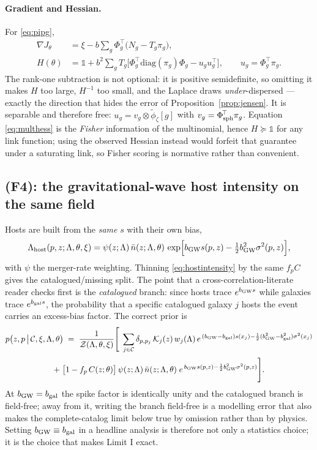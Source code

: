 \documentclass[11pt]{article}
\theoremstyle{definition}
\theoremstyle{remark}
\newcommand{\bgw}{b_{\rm GW}}
\newcommand{\bgal}{b_{\rm gal}}
\newcommand{\nbar}{\bar n}
\newcommand{\Lhost}{\Lambda_{\rm host}}
\begin{document}
\paragraph{Gradient and Hessian.} For \eqref{eq:pipg},
\begin{align}
  \nabla J_\theta &= \xi-b\sum_g\Phi_g^{\!\top}\big(N_g-T_g\pi_g\big),
  \label{eq:multgrad}\\
  H(\theta) &= \mathbb 1+b^2\sum_gT_g\Big[\Phi_g^{\!\top}\mathrm{diag}(\pi_g)\Phi_g
              -u_gu_g^{\!\top}\Big],\qquad u_g=\Phi_g^{\!\top}\pi_g .
  \label{eq:multhess}
\end{align}
The rank-one subtraction is not optional: it is positive semidefinite, so omitting
it makes $H$ too large, $H^{-1}$ too small, and the Laplace draws
\emph{under}-dispersed --- exactly the direction that hides the error of
Proposition~\ref{prop:jensen}. It is separable and therefore free:
$u_g=v_g\otimes\tilde\phi_\zeta[g]$ with $v_g=\Phi_{\rm sph}^{\!\top}\pi_g$.
Equation \eqref{eq:multhess} is the \emph{Fisher} information of the multinomial,
hence $H\succeq\mathbb 1$ for any link function; using the observed Hessian instead
would forfeit that guarantee under a saturating link, so Fisher scoring is
normative rather than convenient.

\subsection{(F4): the gravitational-wave host intensity on the same field}

Hosts are built from the \emph{same} $s$ with their own bias,
\begin{equation}
  \Lhost(p,z;\Lambda,\theta,\xi)=\psi(z;\Lambda)\,\nbar(z;\Lambda,\theta)\,
  \exp\!\Big[\bgw s(p,z)-\tfrac12\bgw^2\sigma^2(p,z)\Big],
  \label{eq:hostintensity}
\end{equation}
with $\psi$ the merger-rate weighting. Thinning \eqref{eq:hostintensity} by the same
$f_pC$ gives the catalogued/missing split. The point that a
cross-correlation-literate reader checks first is the \emph{catalogued} branch:
since hosts trace $e^{\bgw s}$ while galaxies trace $e^{\bgal s}$, the probability
that a specific catalogued galaxy $j$ hosts the event carries an excess-bias
factor. The correct prior is
\begin{multline}
  p\big(z,p\,\big|\,\mathcal C,\xi,\Lambda,\theta\big)
  \;=\;\frac{1}{\mathcal Z(\Lambda,\theta,\xi)}
   \Bigg[\;\sum_{j\in\mathcal C}\delta_{p,p_j}\,\mathcal K_j(z)\,w_j(\Lambda)\,
        e^{\,(\bgw-\bgal)s(x_j)-\frac12(\bgw^2-\bgal^2)\sigma^2(x_j)}\\[2pt]
   +\;\big[1-f_p\,C(z;\theta)\big]\,\psi(z;\Lambda)\,\nbar(z;\Lambda,\theta)\;
     e^{\,\bgw s(p,z)-\frac12\bgw^2\sigma^2(p,z)}\Bigg].
  \label{eq:zpriornew}
\end{multline}
At $\bgw=\bgal$ the spike factor is identically unity and the catalogued branch is
field-free; away from it, writing the branch field-free is a modelling error that
also makes the complete-catalog limit below true by omission rather than by
physics. Setting $\bgw\equiv\bgal$ in a headline analysis is therefore not only a
statistics choice; it is the choice that makes Limit I exact.
\end{document}
